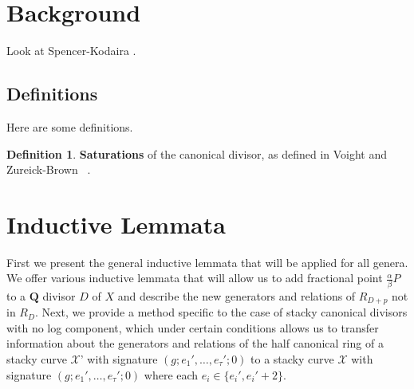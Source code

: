 \documentclass{amsart}
\theoremstyle{plain}
\theoremstyle{definition}
\newtheorem{defn}[thm]{Definition}
\theoremstyle{remark}
\numberwithin{equation}{section}
\newcommand \sx{\mathscr X}
\begin{document}


\section{Background}
\label{sec:background}
Look at Spencer-Kodaira \cite{kodaira:complex-manifolds}.

\subsection{Definitions}
Here are some definitions.

\begin{defn}
\label{defn:sat}
\textbf{Saturations} of the canonical divisor, as defined in Voight
and Zureick-Brown ~\cite[Section 7.2]{vzb:stacky}.
\end{defn}




\section{Inductive Lemmata}
\label{sec:induction}
First we present the general inductive lemmata that will be applied
for all genera.  We offer various inductive lemmata that will allow us to add fractional point $\frac{\alpha}{\beta}P$ to a $\mathbf{Q}$ divisor $D$ of $X$ and describe the new generators and relations of $R_{D+p}$ not in $R_D$.  Next, we provide a method specific to the case of stacky canonical divisors with no log component, which under certain conditions allows us to transfer information about the generators and relations of the half canonical ring of a stacky curve $\sx$' with signature $(g; e_1', \ldots, e_\tau'; 0)$ to a stacky curve $\sx$ with signature $(g; e_1', \ldots, e_\tau'; 0)$ where each $e_i\in \{e_i', e_i'+2\}$.    
\end{document}
